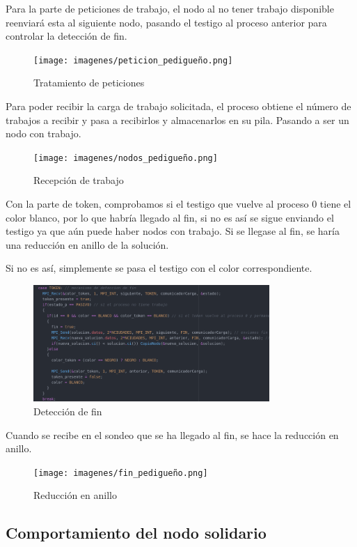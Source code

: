 Para la parte de peticiones de trabajo, el nodo al no tener trabajo disponible reenviará esta al siguiente nodo, pasando el testigo al proceso anterior para controlar la detección de fin.

\begin{figure}[H]
\centering
\texttt{[image: imagenes/peticion\_pedigueño.png]}
\caption{Tratamiento de peticiones}
\end{figure}

Para poder recibir la carga de trabajo solicitada, el proceso obtiene el número de trabajos a recibir y pasa a recibirlos y almacenarlos en su pila. Pasando a ser un nodo con trabajo.

\begin{figure}[H]
\centering
\texttt{[image: imagenes/nodos\_pedigueño.png]}
\caption{Recepción de trabajo}
\end{figure}

Con la parte de token, comprobamos si el testigo que vuelve al proceso 0 tiene el color blanco, por lo que habría llegado al fin, si no es así se sigue enviando el testigo ya que aún puede haber nodos con trabajo. Si se llegase al fin, se haría una reducción en anillo de la solución.

Si no es así, simplemente se pasa el testigo con el color correspondiente.

\begin{figure}[H]
\centering
\includegraphics[width=0.8\textwidth]{imagenes/token.png}
\caption{Detección de fin}
\end{figure}

Cuando se recibe en el sondeo que se ha llegado al fin, se hace la reducción en anillo.

\begin{figure}[H]
\centering
\texttt{[image: imagenes/fin\_pedigueño.png]}
\caption{Reducción en anillo}
\end{figure}

\subsection{Comportamiento del nodo solidario}


